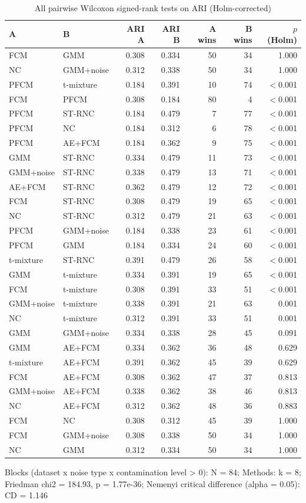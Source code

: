 \begin{table}[t]
\centering
\scriptsize
\setlength{\tabcolsep}{3pt}
\caption{All pairwise Wilcoxon signed-rank tests on ARI (Holm-corrected)}
\label{tab:pairwise}
\begin{tabular}{llrrrrr}
\toprule
A & B & ARI A & ARI B & A wins & B wins & $p$ (Holm) \\
\midrule
FCM & GMM & 0.308 & 0.334 & 50 & 34 & 1.000 \\
NC & GMM+noise & 0.312 & 0.338 & 50 & 34 & 1.000 \\
PFCM & t-mixture & 0.184 & 0.391 & 10 & 74 & $<$0.001 \\
FCM & PFCM & 0.308 & 0.184 & 80 & 4 & $<$0.001 \\
PFCM & ST-RNC & 0.184 & 0.479 & 7 & 77 & $<$0.001 \\
PFCM & NC & 0.184 & 0.312 & 6 & 78 & $<$0.001 \\
PFCM & AE+FCM & 0.184 & 0.362 & 9 & 75 & $<$0.001 \\
GMM & ST-RNC & 0.334 & 0.479 & 11 & 73 & $<$0.001 \\
GMM+noise & ST-RNC & 0.338 & 0.479 & 13 & 71 & $<$0.001 \\
AE+FCM & ST-RNC & 0.362 & 0.479 & 12 & 72 & $<$0.001 \\
FCM & ST-RNC & 0.308 & 0.479 & 19 & 65 & $<$0.001 \\
NC & ST-RNC & 0.312 & 0.479 & 21 & 63 & $<$0.001 \\
PFCM & GMM+noise & 0.184 & 0.338 & 23 & 61 & $<$0.001 \\
PFCM & GMM & 0.184 & 0.334 & 24 & 60 & $<$0.001 \\
t-mixture & ST-RNC & 0.391 & 0.479 & 26 & 58 & $<$0.001 \\
GMM & t-mixture & 0.334 & 0.391 & 19 & 65 & $<$0.001 \\
FCM & t-mixture & 0.308 & 0.391 & 33 & 51 & $<$0.001 \\
GMM+noise & t-mixture & 0.338 & 0.391 & 21 & 63 & 0.001 \\
NC & t-mixture & 0.312 & 0.391 & 33 & 51 & 0.001 \\
GMM & GMM+noise & 0.334 & 0.338 & 28 & 45 & 0.091 \\
GMM & AE+FCM & 0.334 & 0.362 & 36 & 48 & 0.629 \\
t-mixture & AE+FCM & 0.391 & 0.362 & 45 & 39 & 0.629 \\
FCM & AE+FCM & 0.308 & 0.362 & 47 & 37 & 0.813 \\
GMM+noise & AE+FCM & 0.338 & 0.362 & 38 & 46 & 0.813 \\
NC & AE+FCM & 0.312 & 0.362 & 48 & 36 & 0.883 \\
FCM & NC & 0.308 & 0.312 & 45 & 39 & 1.000 \\
FCM & GMM+noise & 0.308 & 0.338 & 50 & 34 & 1.000 \\
NC & GMM & 0.312 & 0.334 & 50 & 34 & 1.000 \\
\bottomrule
\end{tabular}
\par\smallskip\parbox{\linewidth}{\footnotesize Blocks (dataset x noise type x contamination level > 0): N = 84; Methods: k = 8; Friedman chi2 = 184.93, p = 1.77e-36; Nemenyi critical difference (alpha = 0.05): CD = 1.146}
\end{table}
